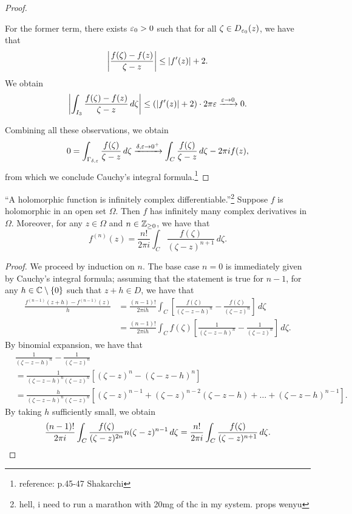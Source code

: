 \begin{proof}
\begin{enumerate}[(i)]
        For the former term, there exists $\varepsilon_0 > 0$ such that for all $\zeta \in D_{\varepsilon_0}(z)$, we have that
        \[ \left\lvert \frac{f(\zeta) - f(z)}{\zeta - z} \right\rvert \leq \left\lvert f'(z) \right\rvert + 2. \]
        We obtain
        \[ \left\lvert \int_{I_3} \frac{f(\zeta) - f(z)}{\zeta - z} \, d\zeta \right\rvert \leq (\left\lvert f'(z) \right\rvert + 2) \cdot 2\pi \varepsilon \xrightarrow{\varepsilon \to 0} 0. \]
    \end{enumerate}
    Combining all these observations, we obtain
    \[ 0 = \int_{\Gamma_{\delta,\varepsilon}} \frac{f(\zeta)}{\zeta - z} \, d\zeta \xrightarrow{\delta,\varepsilon \to 0^+} \int_C \frac{f(\zeta)}{\zeta - z} \, d\zeta - 2\pi i f(z), \]
    from which we conclude Cauchy's integral formula.\footnote{reference: p.45-47 Shakarchi}
\end{proof}

\newpage
\begin{theorem}
    ``A holomorphic function is infinitely complex differentiable.''\footnote{hell, i need to run a marathon with 20mg of thc in my system. props wenyu} Suppose $f$ is holomorphic in an open set $\Omega$. Then $f$ has infinitely many complex derivatives in $\Omega$. Moreover, for any $z \in \Omega$ and $n \in \mathbb Z_{\geq 0}$, we have that
    \[ f^{(n)}(z) = \frac{n!}{2 \pi i} \int_C \frac{f(\zeta)}{(\zeta - z)^{n+1}} \, d\zeta. \]
\end{theorem}
\begin{proof}
    We proceed by induction on $n$. The base case $n = 0$ is immediately given by Cauchy's integral formula; assuming that the statement is true for $n - 1$, for any $h \in \mathbb C \setminus \{0\}$ such that $z + h \in D$, we have that
    \begin{align*}
        \frac{f^{(n-1)}(z+h) - f^{(n-1)}(z)}{h} &= \frac{(n-1)!}{2 \pi i h} \int_C \left[\frac{f(\zeta)}{(\zeta - z - h)^n} - \frac{f(\zeta)}{(\zeta - z)^n}\right] \, d\zeta \\
        &= \frac{(n-1)!}{2 \pi i h} \int_C f(\zeta) \left[\frac{1}{(\zeta - z - h)^n} - \frac{1}{(\zeta - z)^n}\right] \, d\zeta.
    \end{align*}
    By binomial expansion, we have that
    \begin{align*}
        &\frac{1}{(\zeta - z - h)^n} - \frac{1}{(\zeta - z)^n} \\
        &= \frac{1}{(\zeta - z - h)^n (\zeta - z)^n} \left[(\zeta - z)^n - (\zeta - z - h)^n\right] \\
        &= \frac{h}{(\zeta - z - h)^n (\zeta - z)^n} \left[(\zeta - z)^{n-1} + (\zeta - z)^{n-2}(\zeta - z - h) + \dots + (\zeta - z - h)^{n-1}\right].
    \end{align*}
    By taking $h$ sufficiently small, we obtain
    \[ \frac{(n - 1)!}{2 \pi i} \int_C \frac{f(\zeta)}{(\zeta - z)^{2n}} n(\zeta - z)^{n-1} \, d\zeta = \frac{n!}{2 \pi i} \int_C \frac{f(\zeta)}{(\zeta - z)^{n+1}} \, d\zeta. \qedhere \]
\end{proof}
